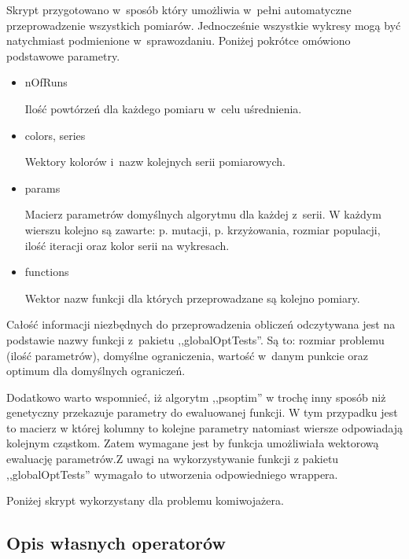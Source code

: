 \documentclass[11pt, a4paper]{article}
\newcommand{\fbi}{\leavevmode{\parindent=1em\indent}}
\begin{document}
\fbi
Skrypt przygotowano w~sposób który umożliwia w~pełni automatyczne przeprowadzenie wszystkich pomiarów. Jednocześnie wszystkie wykresy mogą być natychmiast podmienione w~sprawozdaniu. Poniżej pokrótce omówiono podstawowe parametry.


\begin{itemize}
	\item nOfRuns
	
	Ilość powtórzeń dla każdego pomiaru w~celu uśrednienia.
	
	\item colors, series
	
	Wektory kolorów i~nazw kolejnych serii pomiarowych. 
	
	\item params
	
	Macierz parametrów domyślnych algorytmu dla każdej z~serii. W każdym wierszu kolejno są zawarte: p. mutacji, p. krzyżowania, rozmiar populacji, ilość iteracji oraz kolor serii na wykresach.
	
	\item functions
	
	Wektor nazw funkcji dla których przeprowadzane są kolejno pomiary.
	
\end{itemize}

Całość informacji niezbędnych do przeprowadzenia obliczeń odczytywana jest na podstawie nazwy funkcji z~pakietu ,,globalOptTests''. Są to: rozmiar problemu (ilość parametrów), domyślne ograniczenia, wartość w~danym punkcie oraz optimum dla domyślnych ograniczeń.

\fbi
Dodatkowo warto wspomnieć, iż algorytm ,,psoptim'' w trochę inny sposób niż genetyczny przekazuje parametry do ewaluowanej funkcji. W tym przypadku jest to macierz w której kolumny to kolejne parametry natomiast wiersze odpowiadają kolejnym cząstkom. Zatem wymagane jest by funkcja umożliwiała wektorową ewaluację parametrów.Z uwagi na wykorzystywanie funkcji z pakietu ,,globalOptTests'' wymagało to utworzenia odpowiedniego wrappera.


\fbi
Poniżej skrypt wykorzystany dla problemu komiwojażera.




\subsection{Opis własnych operatorów}
\end{document}

